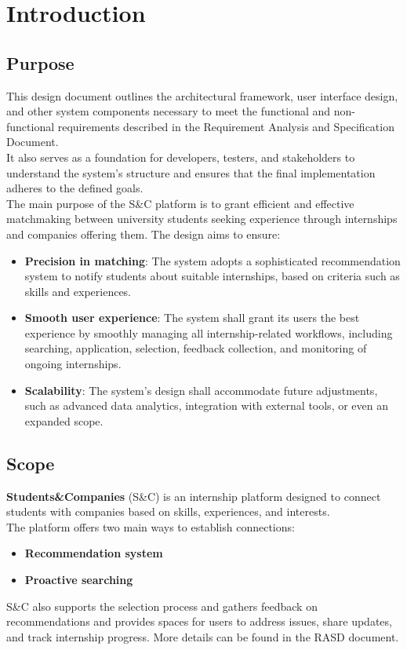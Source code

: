 \documentclass[11pt,twoside]{article}
\begin{document}
\newpage

\tableofcontents

\newpage

\section{Introduction}
	\subsection{Purpose}
This design document outlines the architectural framework, user interface design, and other system components necessary to meet the functional and non-functional requirements described in the Requirement Analysis and Specification Document. \\
It also serves as a foundation for developers, testers, and stakeholders to understand the system's structure and ensures that the final implementation adheres to the defined goals. \\
The main purpose of the S\&C platform is to grant efficient and effective matchmaking between university students seeking experience through internships and companies offering them. The design aims to ensure:
\begin{itemize}
\item \textbf{Precision in matching}: The system adopts a sophisticated recommendation system to notify students about suitable internships, based on criteria such as skills and experiences.
\item \textbf{Smooth user experience}: The system shall grant its users the best experience by smoothly managing all internship-related workflows, including searching, application, selection, feedback collection, and monitoring of ongoing internships.
\item \textbf{Scalability}: The system's design shall accommodate future adjustments, such as advanced data analytics, integration with external tools, or even an expanded scope.
\end{itemize}

	\subsection{Scope}
\textbf{Students\&Companies} (S\&C) is an internship platform designed to connect students with companies based on skills, experiences, and interests. \\
The platform offers two main ways to establish connections:
\begin{itemize}
\item \textbf{Recommendation system}
\item \textbf{Proactive searching}
\end{itemize}
S\&C also supports the selection process  and gathers feedback on recommendations and provides spaces for users to address issues, share updates, and track internship progress.
More details can be found in the RASD document.
\end{document}
